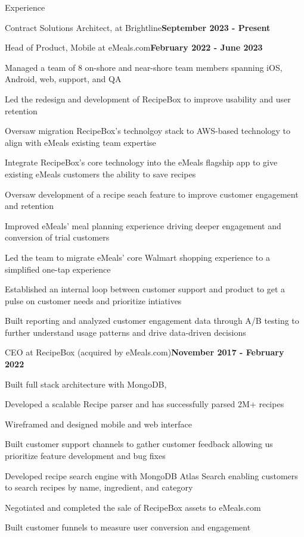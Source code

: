 \documentclass{resume} %
\begin{document}
\begin{rSection}{Experience}
\begin{rSubsection}{Contract Solutions Architect, at Brightline}{\bf September 2023 - Present}{}{}
    \end{rSubsection}



    \begin{rSubsection}{Head of Product, Mobile at eMeals.com}{\bf February 2022 - June 2023}{}{}

    \item Managed a team of 8 on-shore and near-shore team members spanning iOS, Android, web, support, and QA
    \item Led the redesign and development of RecipeBox to improve usability and user retention
    \item Oversaw migration RecipeBox's technolgoy stack to AWS-based technology to align with eMeals existing team expertise
    \item Integrate RecipeBox's core technology into the eMeals flagship app to give existing eMeals customers the ability to save recipes
    \item Oversaw development of a recipe seach feature to improve customer engagement and retention
    \item Improved eMeals' meal planning experience driving deeper engagement and conversion of trial customers
    \item Led the team to migrate eMeals' core Walmart shopping experience to a simplified one-tap experience
    \item Established an internal loop between customer support and product to get a pulse on customer needs and prioritize intiatives
    \item Built reporting and analyzed customer engagement data through A/B testing to further understand usage patterns and drive data-driven decisions

    \end{rSubsection}


    \begin{rSubsection}{CEO at RecipeBox (acquired by eMeals.com)}{\bf November 2017 - February 2022}{}{}

    \item Built full stack architecture with MongoDB, 
    \item Developed a scalable Recipe parser and has successfully parsed 2M+ recipes
    \item Wireframed and designed mobile and web interface
    \item Built customer support channels to gather customer feedback allowing us prioritize feature development and bug fixes
    \item Developed recipe search engine with MongoDB Atlas Search enabling customers to search recipes by name, ingredient, and category
    \item Negotiated and completed the sale of RecipeBox assets to eMeals.com
    \item Built customer funnels to measure user conversion and engagement 
    

\end{rSubsection}
\end{rSection}
\end{document}
